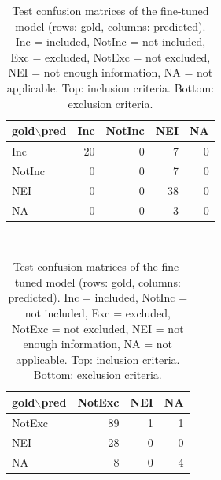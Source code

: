 \begin{table}[t]\centering\footnotesize
\caption{Test confusion matrices of the fine-tuned model (rows: gold, columns: predicted). Inc = included, NotInc = not included, Exc = excluded, NotExc = not excluded, NEI = not enough information, NA = not applicable. Top: inclusion criteria. Bottom: exclusion criteria.}\label{tab:conf}
\begin{tabular}{lrrrr}\toprule
 gold$\backslash$pred & Inc & NotInc & NEI & NA\\\midrule
Inc & 20 & 0 & 7 & 0\\
NotInc & 0 & 0 & 7 & 0\\
NEI & 0 & 0 & 38 & 0\\
NA & 0 & 0 & 3 & 0\\\bottomrule\end{tabular}\\[4pt]
\begin{tabular}{lrrr}\toprule
 gold$\backslash$pred & NotExc & NEI & NA\\\midrule
NotExc & 89 & 1 & 1\\
NEI & 28 & 0 & 0\\
NA & 8 & 0 & 4\\\bottomrule\end{tabular}
\end{table}
